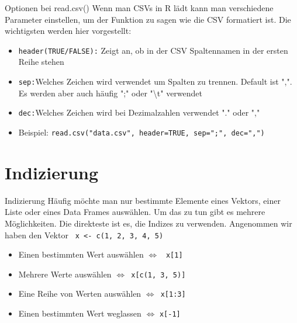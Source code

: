 \documentclass[xcolor=dvipsnames, aspectratio = 169]{beamer}
\begin{document}
\begin{frame}[fragile]{Optionen bei read.csv()}
Wenn man CSVs in R lädt kann man verschiedene Parameter einstellen, um der Funktion zu sagen wie die CSV formatiert ist. Die wichtigsten werden hier vorgestellt:
  \begin{itemize}
	  \item \verb +header(TRUE/FALSE):+ Zeigt an, ob in der CSV Spaltennamen in der ersten Reihe stehen
	  \item \verb +sep:+Welches Zeichen wird verwendet um Spalten zu trennen. Default ist ",". Es werden aber auch häufig ";" oder "\textbackslash t" verwendet
	  \item \verb +dec:+Welches Zeichen wird bei Dezimalzahlen verwendet "." oder ","
	  \item	Beispiel: \verb +read.csv("data.csv", header=TRUE, sep=";", dec=",")+
  \end{itemize}
\end{frame}

\section{Indizierung}
\begin{frame}[fragile]{Indizierung}
	Häufig möchte man nur bestimmte Elemente eines Vektors, einer Liste oder eines Data Frames auswählen. Um das zu tun gibt es mehrere Möglichkeiten. Die direkteste ist es, die Indizes zu verwenden. Angenommen wir haben den Vektor \verb + x <- c(1, 2, 3, 4, 5) +
	\begin{itemize}
		\item  Einen bestimmten Wert auswählen $\Leftrightarrow$ \verb+ x[1]+
		\item  Mehrere Werte auswählen $\Leftrightarrow$\verb+ x[c(1, 3, 5)]+
		\item  Eine Reihe von Werten auswählen $\Leftrightarrow$\verb+ x[1:3]+
		\item  Einen bestimmten Wert weglassen $\Leftrightarrow$ \verb+x[-1]+
	\end{itemize}
\end{frame}
\end{document}
